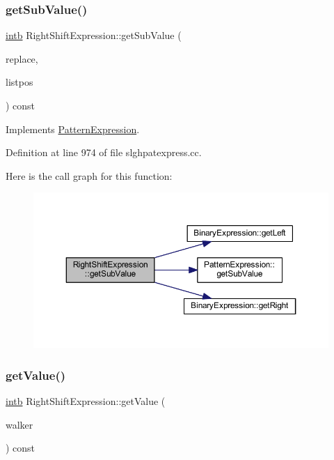 \subsubsection{\texorpdfstring{getSubValue()}{getSubValue()}}
{\footnotesize\ttfamily \mbox{\hyperlink{types_8h_aa925ba3e627c2df89d5b1cfe84fb8572}{intb}} Right\+Shift\+Expression\+::get\+Sub\+Value (\begin{DoxyParamCaption}\item[{const vector$<$ \mbox{\hyperlink{types_8h_aa925ba3e627c2df89d5b1cfe84fb8572}{intb}} $>$ \&}]{replace,  }\item[{int4 \&}]{listpos }\end{DoxyParamCaption}) const\hspace{0.3cm}{\ttfamily [virtual]}}



Implements \mbox{\hyperlink{class_pattern_expression_ade37db4aa76dd442b189bf4a6bb2d9dd}{Pattern\+Expression}}.



Definition at line 974 of file slghpatexpress.\+cc.

Here is the call graph for this function\+:
\nopagebreak
\begin{figure}[H]
\begin{center}
\leavevmode
\includegraphics[width=350pt]{class_right_shift_expression_a4b2484ca5edaa72d1afaf11a61ce1389_cgraph}
\end{center}
\end{figure}
\mbox{\label{class_right_shift_expression_af14326c4721f55d083ee08d911b4ffab}} 
\subsubsection{\texorpdfstring{getValue()}{getValue()}}
{\footnotesize\ttfamily \mbox{\hyperlink{types_8h_aa925ba3e627c2df89d5b1cfe84fb8572}{intb}} Right\+Shift\+Expression\+::get\+Value (\begin{DoxyParamCaption}\item[{\mbox{\hyperlink{class_parser_walker}{Parser\+Walker}} \&}]{walker }\end{DoxyParamCaption}) const\hspace{0.3cm}{\ttfamily [virtual]}}



